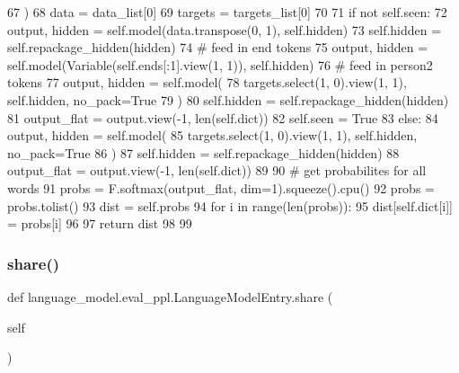 \begin{DoxyCode}
67         )
68         data = data\_list[0]
69         targets = targets\_list[0]
70 
71         \textcolor{keywordflow}{if} \textcolor{keywordflow}{not} self.seen:
72             output, hidden = self.model(data.transpose(0, 1), self.hidden)
73             self.hidden = self.repackage\_hidden(hidden)
74             \textcolor{comment}{# feed in end tokens}
75             output, hidden = self.model(Variable(self.ends[:1].view(1, 1)), self.hidden)
76             \textcolor{comment}{# feed in person2 tokens}
77             output, hidden = self.model(
78                 targets.select(1, 0).view(1, 1), self.hidden, no\_pack=\textcolor{keyword}{True}
79             )
80             self.hidden = self.repackage\_hidden(hidden)
81             output\_flat = output.view(-1, len(self.dict))
82             self.seen = \textcolor{keyword}{True}
83         \textcolor{keywordflow}{else}:
84             output, hidden = self.model(
85                 targets.select(1, 0).view(1, 1), self.hidden, no\_pack=\textcolor{keyword}{True}
86             )
87             self.hidden = self.repackage\_hidden(hidden)
88             output\_flat = output.view(-1, len(self.dict))
89 
90         \textcolor{comment}{# get probabilites for all words}
91         probs = F.softmax(output\_flat, dim=1).squeeze().cpu()
92         probs = probs.tolist()
93         dist = self.probs
94         \textcolor{keywordflow}{for} i \textcolor{keywordflow}{in} range(len(probs)):
95             dist[self.dict[i]] = probs[i]
96 
97         \textcolor{keywordflow}{return} dist
98 
99 
\end{DoxyCode}
\mbox{\label{classlanguage__model_1_1eval__ppl_1_1LanguageModelEntry_a3a4b8adc4c891d9de5626b7c15e088a8}} 
\subsubsection{\texorpdfstring{share()}{share()}}
{\footnotesize\ttfamily def language\+\_\+model.\+eval\+\_\+ppl.\+Language\+Model\+Entry.\+share (\begin{DoxyParamCaption}\item[{}]{self }\end{DoxyParamCaption})}



